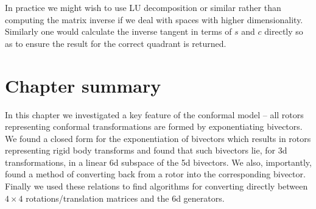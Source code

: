 In practice we might wish to use LU decomposition or similar rather
than computing the matrix inverse if we deal with spaces with higher
dimensionality. Similarly one would calculate the inverse tangent in terms
of $s$ and $c$ directly so as to ensure the result for the correct quadrant is
returned.

\section{Chapter summary}

In this chapter we investigated a key feature of the conformal model -- all
rotors representing conformal transformations are formed by exponentiating
bivectors. We found a closed form for the exponentiation of bivectors
which results in rotors representing rigid body transforms and found
that such bivectors lie, for 3d transformations, in a linear 6d subspace
of the 5d bivectors. We also, importantly, found a method of converting back
from a rotor into the corresponding bivector. Finally we used these relations
to find algorithms for converting directly between $4 \times 4$
rotations/translation matrices and the 6d generators.
